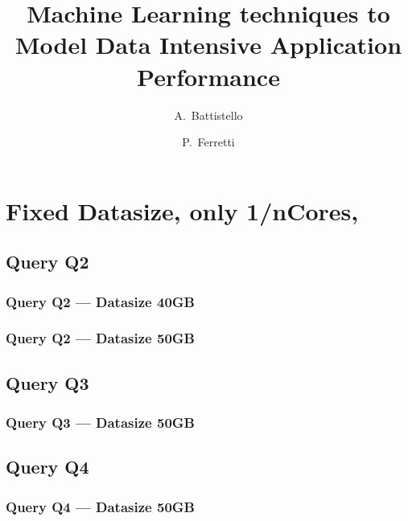 \documentclass[a4paper,11pt]{article}
\author{A.~Battistello\and P.~Ferretti}
\title{Machine Learning techniques to Model Data Intensive Application Performance}
\date{}
\begin{document}
\maketitle
\tableofcontents




\newpage
\section{Fixed Datasize, only 1/nCores,}
\subsection{Query Q2}
\subsubsection{Query Q2 --- Datasize 40GB}



\newpage
\subsubsection{Query Q2 --- Datasize 50GB}



\newpage

\subsection{Query Q3}
\subsubsection{Query Q3 --- Datasize 50GB}



\newpage

\subsection{Query Q4}
\subsubsection{Query Q4 --- Datasize 50GB}



\newpage
\end{document}
